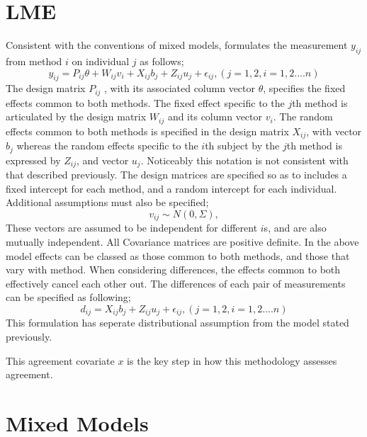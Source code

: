 \documentclass[12pt, a4paper]{report}
\theoremstyle{plain}
\theoremstyle{definition}
\theoremstyle{remark}
\begin{document}
\section{LME}
Consistent with the conventions of mixed models, \citet{pkc}
formulates the measurement $y_{ij} $from method $i$ on individual
$j$ as follows;
\begin{equation}
y_{ij} =P_{ij}\theta + W_{ij}v_{i} + X_{ij}b_{j} + Z_{ij}u_{j} +
\epsilon_{ij},     (j=1,2, i=1,2....n)
\end{equation}
The design matrix $P_{ij}$ , with its associated column vector
$\theta$, specifies the fixed effects common to both methods. The
fixed effect specific to the $j$th method is articulated by the
design matrix $W_{ij}$ and its column vector $v_{i}$. The random
effects common to both methods is specified in the design matrix
$X_{ij}$, with vector $b_{j}$ whereas the random effects specific
to the $i$th subject by the $j$th method is expressed by $Z_{ij}$,
and vector $u_{j}$. Noticeably this notation is not consistent
with that described previously.  The design matrices are specified
so as to includes a fixed intercept for each method, and a random
intercept for each individual. Additional assumptions must also be
specified;
\begin{equation}
v_{ij} \sim N(0,\Sigma),
\end{equation}
These vectors are assumed to be independent for different $i$s,
and are also mutually independent. All Covariance matrices are
positive definite.  In the above model effects can be classed as
those common to both methods, and those that vary with method.
When considering differences, the effects common to both
effectively cancel each other out. The differences of each pair of
measurements can be specified as following;
\begin{equation}
d_{ij} = X_{ij}b_{j} + Z_{ij}u_{j} + \epsilon_{ij},     (j=1,2,
i=1,2....n)
\end{equation}
This formulation has seperate distributional assumption from the
model stated previously.

This agreement covariate $x$ is the key step in how this
methodology assesses agreement.



\section{Mixed Models}
\end{document}
